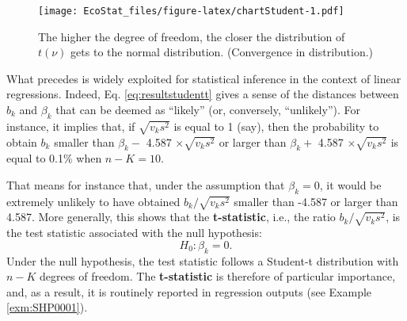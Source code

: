 \documentclass[
  12pt,
]{book}
\theoremstyle{definition}
\theoremstyle{definition}
\theoremstyle{definition}
\theoremstyle{definition}
\theoremstyle{remark}
\begin{document}
\begin{figure}
\centering
\texttt{[image: EcoStat\_files/figure-latex/chartStudent-1.pdf]}
\caption{\label{fig:chartStudent}The higher the degree of freedom, the closer the distribution of \(t(\nu)\) gets to the normal distribution. (Convergence in distribution.)}
\end{figure}

What precedes is widely exploited for statistical inference in the context of linear regressions. Indeed, Eq. \eqref{eq:resultstudentt} gives a sense of the distances between \(b_k\) and \(\beta_k\) that can be deemed as ``likely'' (or, conversely, ``unlikely''). For instance, it implies that, if \(\sqrt{v_k s^2}\) is equal to 1 (say), then the probability to obtain \(b_k\) smaller than \(\beta_k-\) 4.587 \(\times \sqrt{v_k s^2}\) or larger than \(\beta_k+\) 4.587 \(\times \sqrt{v_k s^2}\) is equal to 0.1\% when \(n-K=10\).

That means for instance that, under the assumption that \(\beta_k=0\), it would be extremely unlikely to have obtained \(b_k/\sqrt{v_k s^2}\) smaller than -4.587 or larger than 4.587. More generally, this shows that the \textbf{t-statistic}, i.e., the ratio \(b_k/\sqrt{v_k s^2}\), is the test statistic associated with the null hypothesis:
\[
H_0: \beta_k=0.
\]
Under the null hypothesis, the test statistic follows a Student-t distribution with \(n-K\) degrees of freedom. The \textbf{t-statistic} is therefore of particular importance, and, as a result, it is routinely reported in regression outputs (see Example \ref{exm:SHP0001}).
\end{document}
